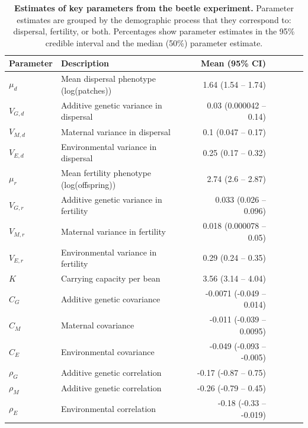 \documentclass[11pt]{article}
\begin{document}
\renewcommand{\thetable}{\arabic{table}}
\setcounter{table}{0}

\newpage{}
\begin{table}[h]
\centering
\label{Estimates of key parameters from the beetle experiment}
\caption[Estimates of key parameters from the beetle experiment]{\textbf{Estimates of key parameters from the beetle experiment.} Parameter estimates are grouped by the demographic process that they correspond to: dispersal, fertility, or both. Percentages show parameter estimates in the 95\% credible interval and the median (50\%) parameter estimate.}\label{corr:estimates}\vspace{0.1in}
\begin{tabularx}{0.95\linewidth}{lXrrrrr}
\toprule
Parameter   & Description                               & Mean (95\% CI) \\ \midrule
$\mu_{d}$   & Mean dispersal phenotype (log(patches)) & 1.64 (1.54 -- 1.74) \\
$V_{G,d}$   & Additive genetic variance in dispersal &  0.03 (0.000042 -- 0.14)  \\
$V_{M,d}$   & Maternal variance in dispersal    &  0.1 (0.047 -- 0.17)  \\ 
$V_{E,d}$   & Environmental variance in dispersal  &  0.25 (0.17 -- 0.32)  \\ \midrule
$\mu_{r}$   & Mean fertility phenotype (log(offspring)) &  2.74 (2.6 -- 2.87)  \\
$V_{G,r}$   & Additive genetic variance in fertility &  0.033 (0.026 -- 0.096)  \\
$V_{M,r}$   & Maternal variance in fertility &  0.018 (0.000078 -- 0.05)  \\
$V_{E,r}$   & Environmental variance in fertility    &  0.29 (0.24 -- 0.35) \\
$K$         & Carrying capacity per bean   &  3.56 (3.14 -- 4.04)  \\ \midrule
$C_{G}$     & Additive genetic covariance &  -0.0071 (-0.049 -- 0.014) \\
$C_{M}$     & Maternal covariance & -0.011 (-0.039 -- 0.0095) \\
$C_{E}$     & Environmental covariance   & -0.049 (-0.093 -- -0.005)  \\
$\rho_{G}$  & Additive genetic correlation  &  -0.17 (-0.87 -- 0.75)\\
$\rho_{M}$  & Additive genetic correlation  &  -0.26 (-0.79 -- 0.45) \\
$\rho_{E}$  & Environmental correlation     &  -0.18 (-0.33 -- -0.019) \\
\bottomrule
\end{tabularx}
\end{table}
\end{document}
